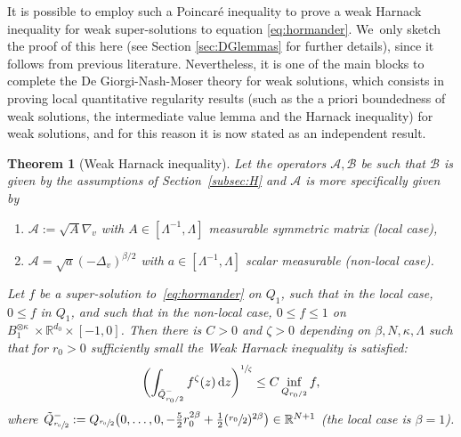 \documentclass[JEP,XML,SOM,Unicode,NoFloatCountersInSection,published]{cedram}
\newenvironment{enumeratei}
{\bgroup\def\theenumi{\roman{enumi}}\def\theenumii{\arabic{enumii}}\begin{enumerate}}
{\end{enumerate}\egroup}
\newtheorem{theorem}{Theorem}
\theoremstyle{definition}
\newcommand\R{{\mathbb R}}
\newcommand{\cA}{{\mathcal A}}
\newcommand{\cB}{{\mathcal B}}
\newcommand{\dd}{{\, \mathrm d}}
\begin{document}
It is possible to employ such a Poincaré inequality to prove a weak Harnack inequality
for weak super-solutions to equation \eqref{eq:hormander}. We~only sketch the proof of this here (see Section \ref{sec:DGlemmas} for further details), since it follows from previous literature. Nevertheless,
it is one of the main blocks to complete the De Giorgi-Nash-Moser theory for weak solutions, which
consists in proving local quantitative regularity results (such as the a priori boundedness of weak solutions, the intermediate value lemma and
the Harnack inequality) for weak solutions, and for this reason it is now stated as an independent result.
\begin{theorem}[Weak Harnack inequality]
\label{thm:weak_harnack_nonlocal}
Let the operators $\cA, \cB$ be such that $\cB$ is given by
the assumptions of Section~\ref{subsec:H} and $\cA$ is more specifically given by
\begin{enumeratei}
\item
$\cA:=\sqrt{A} \nabla_{v}$ with
$A \in [\Lambda^{-1},\Lambda]$ measurable symmetric matrix (local
case),
\item
$\cA = \sqrt{a} (-\Delta_v)^{\beta/2}$ with
$a \in [\Lambda^{-1},\Lambda]$ scalar measurable (non-local
case).
\end{enumeratei}
Let $f$ be a super-solution to~\eqref{eq:hormander} on $Q_1$, such that in the local case, $0 \leq f $ in $Q_1$, and such that in the non-local case,
$0 \le f \le 1$ on $B_1^{\otimes \kappa} \ \times \R^{d_0} \times [-1, 0]$. Then there is $C > 0$
and $\zeta > 0$ depending on $\beta, N, \kappa, \Lambda$ such
that for $r_0 > 0$ sufficiently small the Weak Harnack
inequality is satisfied:\vspace*{-3pt}
\begin{equation}
\biggl(\int_{\tilde Q^-_{r_0/2}} f^\zeta(z) \dd
z\biggr)^{\sfrac{1}{\zeta}} \leq C \inf_{Q_{r_0/2}} f,
\end{equation}
where
$\tilde Q_{\sfrac{r_0}{2}}^- := Q_{\sfrac{r_0}{2}}\big(0, \dots,
0, -\frac{5}{2} r_0^{2\beta} +\frac{1}{2}
(\sfrac{r_0}{2})^{2\beta}\big)\in \R^{N+1}$ (the local
case is $\beta=1$).
\end{theorem}
\end{document}
